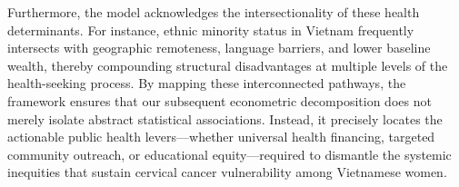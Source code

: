 Furthermore, the model acknowledges the intersectionality of these health determinants. For instance, ethnic minority status in Vietnam frequently intersects with geographic remoteness, language barriers, and lower baseline wealth, thereby compounding structural disadvantages at multiple levels of the health-seeking process. By mapping these interconnected pathways, the framework ensures that our subsequent econometric decomposition does not merely isolate abstract statistical associations. Instead, it precisely locates the actionable public health levers---whether universal health financing, targeted community outreach, or educational equity---required to dismantle the systemic inequities that sustain cervical cancer vulnerability among Vietnamese women.